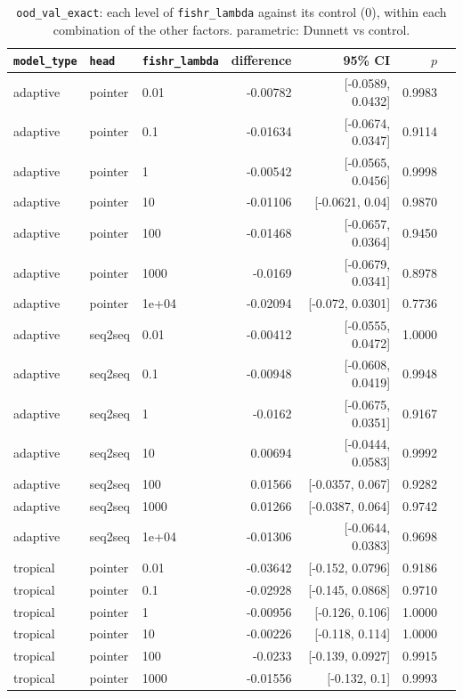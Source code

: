 \documentclass[10pt]{article}
\begin{document}
{\small
\begin{longtable}{lllrrrl}
\caption{\texttt{ood\_val\_exact}: each level of \texttt{fishr\_lambda} against its control (0), within each combination of the other factors. parametric: Dunnett vs control.}\label{tab:control-ood_val_exact}\\
\toprule
\texttt{model\_type} & \texttt{head} & \texttt{fishr\_lambda} & difference & 95\% CI & $p$ & \\
\midrule
\endhead
adaptive & pointer & 0.01 & -0.00782 & [-0.0589, 0.0432] & 0.9983 & \\
adaptive & pointer & 0.1 & -0.01634 & [-0.0674, 0.0347] & 0.9114 & \\
adaptive & pointer & 1 & -0.00542 & [-0.0565, 0.0456] & 0.9998 & \\
adaptive & pointer & 10 & -0.01106 & [-0.0621, 0.04] & 0.9870 & \\
adaptive & pointer & 100 & -0.01468 & [-0.0657, 0.0364] & 0.9450 & \\
adaptive & pointer & 1000 & -0.0169 & [-0.0679, 0.0341] & 0.8978 & \\
adaptive & pointer & 1e+04 & -0.02094 & [-0.072, 0.0301] & 0.7736 & \\
adaptive & seq2seq & 0.01 & -0.00412 & [-0.0555, 0.0472] & 1.0000 & \\
adaptive & seq2seq & 0.1 & -0.00948 & [-0.0608, 0.0419] & 0.9948 & \\
adaptive & seq2seq & 1 & -0.0162 & [-0.0675, 0.0351] & 0.9167 & \\
adaptive & seq2seq & 10 & 0.00694 & [-0.0444, 0.0583] & 0.9992 & \\
adaptive & seq2seq & 100 & 0.01566 & [-0.0357, 0.067] & 0.9282 & \\
adaptive & seq2seq & 1000 & 0.01266 & [-0.0387, 0.064] & 0.9742 & \\
adaptive & seq2seq & 1e+04 & -0.01306 & [-0.0644, 0.0383] & 0.9698 & \\
tropical & pointer & 0.01 & -0.03642 & [-0.152, 0.0796] & 0.9186 & \\
tropical & pointer & 0.1 & -0.02928 & [-0.145, 0.0868] & 0.9710 & \\
tropical & pointer & 1 & -0.00956 & [-0.126, 0.106] & 1.0000 & \\
tropical & pointer & 10 & -0.00226 & [-0.118, 0.114] & 1.0000 & \\
tropical & pointer & 100 & -0.0233 & [-0.139, 0.0927] & 0.9915 & \\
tropical & pointer & 1000 & -0.01556 & [-0.132, 0.1] & 0.9993 & \\

\end{longtable}}
\end{document}
